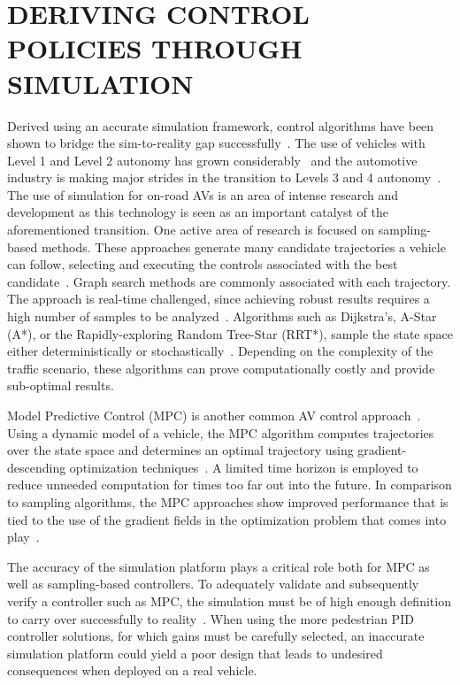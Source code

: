 \documentclass[12pt,twocolumn]{article}
\begin{document}
\section{DERIVING CONTROL POLICIES THROUGH SIMULATION}
\label{sec:ML}
Derived using an accurate simulation framework, control algorithms have been shown to bridge the sim-to-reality gap successfully~\cite{VISTASimMITRL, VirtualToRealRL}. The use of vehicles with Level 1 and Level 2 autonomy has grown considerably~\cite{J3016_201401, SAEHardwareInTheLoop} and the automotive industry is making major strides in the transition to Levels 3 and 4 autonomy~\cite{WayveRLSimToReal, TeslaSummon}. The use of simulation for on-road AVs is an area of intense research and development as this technology is seen as an important catalyst of the aforementioned transition. One active area of research is focused on sampling-based methods. These approaches generate many candidate trajectories a vehicle can follow, selecting and executing the controls associated with the best candidate~\cite{UrbanAVBezierMPC, RRTRealTime}. Graph search methods are commonly associated with each trajectory. The approach is real-time challenged, since achieving robust results requires a high number of samples to be analyzed~\cite{TrajectoryPlanningMIQP}. Algorithms such as Dijkstra's, A-Star (A*), or the Rapidly-exploring Random Tree-Star (RRT*), sample the state space either deterministically or stochastically~\cite{RRTRealTime}. Depending on the complexity of the traffic scenario, these algorithms can prove computationally costly and provide sub-optimal results.

Model Predictive Control (MPC) is another common AV control approach~\cite{Borrelli2005MPCbasedAT}. Using a dynamic model of a vehicle, the MPC algorithm computes trajectories over the state space and determines an optimal trajectory using gradient-descending optimization techniques~\cite{TrajectoryPlanningMIQP, Liniger2017OptimizationBasedAR}. A limited time horizon is employed to reduce unneeded computation for times too far out into the future. In comparison to sampling algorithms, the MPC approaches show improved performance that is tied to the use of the gradient fields in the optimization problem that comes into play~\cite{Borrelli2005MPCbasedAT}.

The accuracy of the simulation platform plays a critical role both for MPC as well as sampling-based controllers. To adequately validate and subsequently verify a controller such as MPC, the simulation must be of high enough definition to carry over successfully to reality~\cite{AVTestingMethods}. When using the more pedestrian PID controller solutions, for which gains must be carefully selected, an inaccurate simulation platform could yield a poor design that leads to undesired consequences when deployed on a real vehicle.
\end{document}
